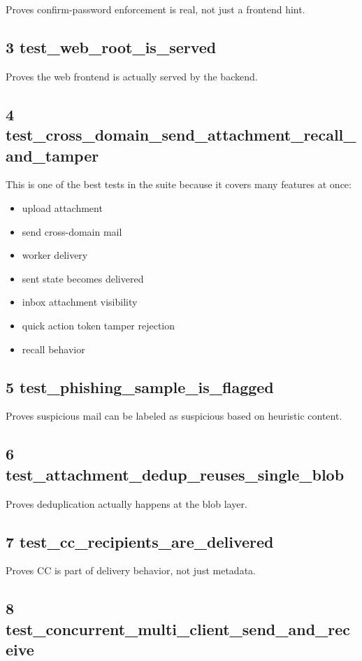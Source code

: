 \documentclass[11pt,a4paper]{article}
\begin{document}
Proves confirm-password enforcement is real, not just a frontend hint.

\subsection{3 test\_web\_root\_is\_served}

Proves the web frontend is actually served by the backend.

\subsection{4 test\_cross\_domain\_send\_attachment\_recall\_and\_tamper}

This is one of the best tests in the suite because it covers many features at once:

\begin{itemize}
\item upload attachment
\item send cross-domain mail
\item worker delivery
\item sent state becomes delivered
\item inbox attachment visibility
\item quick action token tamper rejection
\item recall behavior
\end{itemize}

\subsection{5 test\_phishing\_sample\_is\_flagged}

Proves suspicious mail can be labeled as suspicious based on heuristic content.

\subsection{6 test\_attachment\_dedup\_reuses\_single\_blob}

Proves deduplication actually happens at the blob layer.

\subsection{7 test\_cc\_recipients\_are\_delivered}

Proves CC is part of delivery behavior, not just metadata.

\subsection{8 test\_concurrent\_multi\_client\_send\_and\_receive}
\end{document}
